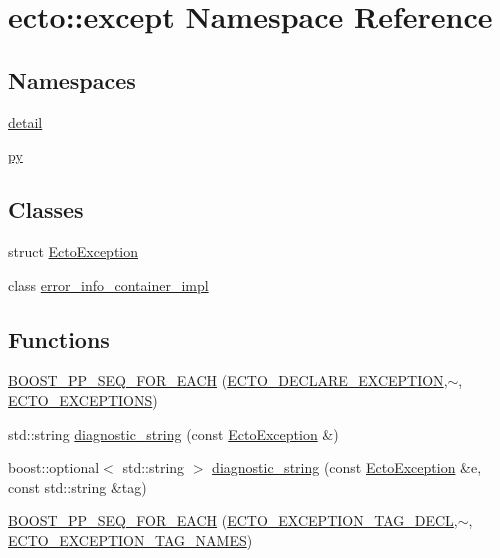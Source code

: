 \hypertarget{namespaceecto_1_1except}{}\section{ecto\+:\+:except Namespace Reference}
\label{namespaceecto_1_1except}
\subsection*{Namespaces}
\begin{DoxyCompactItemize}
\item 
 \hyperlink{namespaceecto_1_1except_1_1detail}{detail}
\item 
 \hyperlink{namespaceecto_1_1except_1_1py}{py}
\end{DoxyCompactItemize}
\subsection*{Classes}
\begin{DoxyCompactItemize}
\item 
struct \hyperlink{structecto_1_1except_1_1EctoException}{Ecto\+Exception}
\item 
class \hyperlink{classecto_1_1except_1_1error__info__container__impl}{error\+\_\+info\+\_\+container\+\_\+impl}
\end{DoxyCompactItemize}
\subsection*{Functions}
\begin{DoxyCompactItemize}
\item 
\hyperlink{namespaceecto_1_1except_a6ed4b851e67551e870e933f85628cb6f}{B\+O\+O\+S\+T\+\_\+\+P\+P\+\_\+\+S\+E\+Q\+\_\+\+F\+O\+R\+\_\+\+E\+A\+C\+H} (\hyperlink{except_8hpp_a9b77695b9c45c36934e7c890ce6f682f}{E\+C\+T\+O\+\_\+\+D\+E\+C\+L\+A\+R\+E\+\_\+\+E\+X\+C\+E\+P\+T\+I\+O\+N},$\sim$, \hyperlink{except_8hpp_ad3bbab1baffa25e20db0635270c5f108}{E\+C\+T\+O\+\_\+\+E\+X\+C\+E\+P\+T\+I\+O\+N\+S})
\item 
std\+::string \hyperlink{namespaceecto_1_1except_a8161938bf962eaf02d9b0e73b80a5c4a}{diagnostic\+\_\+string} (const \hyperlink{structecto_1_1except_1_1EctoException}{Ecto\+Exception} \&)
\item 
boost\+::optional$<$ std\+::string $>$ \hyperlink{namespaceecto_1_1except_abebe710f45e8d06b2df19d02bf15b193}{diagnostic\+\_\+string} (const \hyperlink{structecto_1_1except_1_1EctoException}{Ecto\+Exception} \&e, const std\+::string \&tag)
\item 
\hyperlink{namespaceecto_1_1except_a8744cfe3c8d4364696873aeb175c68b9}{B\+O\+O\+S\+T\+\_\+\+P\+P\+\_\+\+S\+E\+Q\+\_\+\+F\+O\+R\+\_\+\+E\+A\+C\+H} (\hyperlink{except_8hpp_a4a4f231e4fe0f923cd9ee3a48803ca30}{E\+C\+T\+O\+\_\+\+E\+X\+C\+E\+P\+T\+I\+O\+N\+\_\+\+T\+A\+G\+\_\+\+D\+E\+C\+L},$\sim$, \hyperlink{except_8hpp_a6a632b3827deba566cbca48b37bf53e2}{E\+C\+T\+O\+\_\+\+E\+X\+C\+E\+P\+T\+I\+O\+N\+\_\+\+T\+A\+G\+\_\+\+N\+A\+M\+E\+S})
\end{DoxyCompactItemize}


